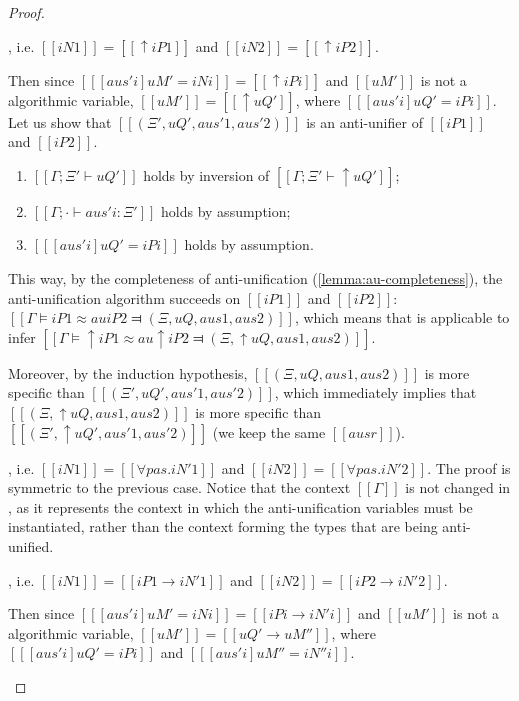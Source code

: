 \begin{proof}
\begin{caseof}
        \item {}, i.e. 
        $[[iN1]] = [[↑iP1]]$ and $[[iN2]] = [[↑iP2]]$.
        \label{case:anti-unification-initial:shiftu}

        Then since $[[ [aus'i] uM' = iNi ]] = [[↑iPi]]$ and $[[uM']]$ is not a algorithmic variable,
        $[[uM']] = [[↑uQ']]$, where $[[ [aus'i] uQ' = iPi ]]$. 
        Let us show that $[[(Ξ', uQ', aus'1, aus'2)]]$ 
        is an anti-unifier of $[[iP1]]$ and $[[iP2]]$.
        \begin{enumerate}
            \item $[[Γ ; Ξ' ⊢ uQ']]$ holds by inversion of $[[Γ ; Ξ' ⊢ ↑uQ']]$;
            \item $[[Γ ; · ⊢ aus'i : Ξ']]$ holds by assumption;
            \item $[[ [aus'i] uQ' = iPi ]]$ holds by assumption.
        \end{enumerate}

        This way, by the completeness of anti-unification 
        (\cref{lemma:au-completeness}),
        the anti-unification algorithm succeeds on $[[iP1]]$ and $[[iP2]]$:
        $[[Γ ⊨ iP1 ≈au iP2 ⫤ (Ξ, uQ, aus1, aus2)]]$,
        which means that  is applicable to infer 
        $[[Γ ⊨ ↑iP1 ≈au ↑iP2 ⫤ (Ξ, ↑uQ, aus1, aus2)]]$.

        Moreover, by the induction hypothesis,
        $[[(Ξ, uQ, aus1, aus2)]]$ is more specific than $[[(Ξ', uQ', aus'1, aus'2)]]$,
        which immediately implies that $[[(Ξ, ↑uQ, aus1, aus2)]]$ is more specific than
        $[[(Ξ', ↑uQ', aus'1, aus'2)]]$ (we keep the same $[[ausr]]$).

        \item {}, i.e. 
        $[[iN1]] = [[∀pas.iN'1]]$ and $[[iN2]] = [[∀pas.iN'2]]$.
        \label{case:anti-unification-initial:forall}
        The proof is symmetric to the previous case.
        Notice that the context $[[Γ]]$ is not changed in , 
        as it represents the context in which the anti-unification variables must be instantiated,
        rather than the context forming the types that are being anti-unified.

        \item {}, i.e.
        $[[iN1]] = [[iP1 → iN'1]]$ and $[[iN2]] = [[iP2 → iN'2]]$.

        Then since $[[ [aus'i] uM' = iNi ]] = [[iPi → iN'i]]$ and $[[uM']]$ is not a algorithmic variable,
        $[[uM']] = [[uQ' → uM'']]$, where $[[ [aus'i] uQ' = iPi ]]$ and $[[ [aus'i] uM'' = iN''i ]]$.


\end{caseof}
\end{proof}
